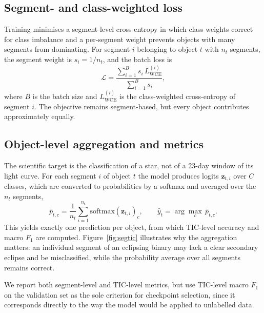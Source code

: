 \documentclass{aa}
\begin{document}
    \subsection{Segment- and class-weighted loss}
    \label{sec:loss}

    Training minimises a segment-level cross-entropy in which class weights correct for class
    imbalance and a per-segment weight prevents objects with many segments from dominating.
    For segment $i$ belonging to object $t$ with $n_t$ segments, the segment weight is
    $s_i = 1/n_t$, and the batch loss is
    \begin{equation}
        \mathcal{L} = \frac{\sum_{i=1}^{B} s_i\, L^{(i)}_{\mathrm{WCE}}}
        {\sum_{i=1}^{B} s_i} ,
        \label{eq:loss}
    \end{equation}
    where $B$ is the batch size and $L^{(i)}_{\mathrm{WCE}}$ is the class-weighted
    cross-entropy of segment $i$. The objective remains segment-based, but every object
    contributes approximately equally.

    \subsection{Object-level aggregation and metrics}
    \label{sec:ticmetrics}

    The scientific target is the classification of a star, not of a 23-day window of its
    light curve. For each segment $i$ of object $t$ the model produces logits
    $\mathbf{z}_{t,i}$ over $C$ classes, which are converted to probabilities by a softmax and
    averaged over the $n_t$ segments,
    \begin{equation}
        \bar{p}_{t,c} = \frac{1}{n_t}\sum_{i=1}^{n_t}
        \mathrm{softmax}\!\left(\mathbf{z}_{t,i}\right)_c ,
        \qquad
        \hat{y}_t = \arg\max_c\, \bar{p}_{t,c} .
        \label{eq:agg}
    \end{equation}
    This yields exactly one prediction per object, from which TIC-level accuracy and macro
    $F_1$ are computed. Figure~\ref{fig:segtic} illustrates why the aggregation matters: an
    individual segment of an eclipsing binary may lack a clear secondary eclipse and be
    misclassified, while the probability average over all segments remains correct.

    We report both segment-level and TIC-level metrics, but use TIC-level macro $F_1$ on the
    validation set as the sole criterion for checkpoint selection, since it corresponds
    directly to the way the model would be applied to unlabelled data.
\end{document}
